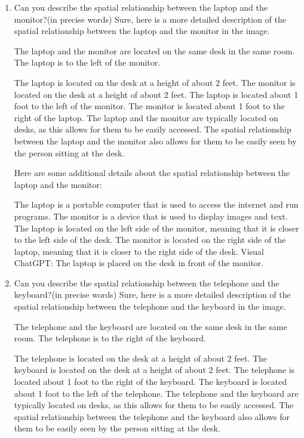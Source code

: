 \begin{enumerate}
    \item Can you describe the spatial relationship between the laptop and the monitor?(in precise words)
    \subitem 
    Sure, here is a more detailed description of the spatial relationship between the laptop and the monitor in the image.
    
    The laptop and the monitor are located on the same desk in the same room. The laptop is to the left of the monitor.
    
    The laptop is located on the desk at a height of about 2 feet.
    The monitor is located on the desk at a height of about 2 feet.
    The laptop is located about 1 foot to the left of the monitor.
    The monitor is located about 1 foot to the right of the laptop.
    The laptop and the monitor are typically located on desks, as this allows for them to be easily accessed. The spatial relationship between the laptop and the monitor also allows for them to be easily seen by the person sitting at the desk.
    
    Here are some additional details about the spatial relationship between the laptop and the monitor:
    
    The laptop is a portable computer that is used to access the internet and run programs.
    The monitor is a device that is used to display images and text.
    The laptop is located on the left side of the monitor, meaning that it is closer to the left side of the desk.
    The monitor is located on the right side of the laptop, meaning that it is closer to the right side of the desk.
    \subitem Visual ChatGPT: The laptop is placed on the desk in front of the monitor.
    \item Can you describe the spatial relationship between the telephone and the keyboard?(in precise words)
    \subitem Sure, here is a more detailed description of the spatial relationship between the telephone and the keyboard in the image.

    The telephone and the keyboard are located on the same desk in the same room. The telephone is to the right of the keyboard.
    
    The telephone is located on the desk at a height of about 2 feet.
    The keyboard is located on the desk at a height of about 2 feet.
    The telephone is located about 1 foot to the right of the keyboard.
    The keyboard is located about 1 foot to the left of the telephone.
    The telephone and the keyboard are typically located on desks, as this allows for them to be easily accessed. The spatial relationship between the telephone and the keyboard also allows for them to be easily seen by the person sitting at the desk.
    

\end{enumerate}
